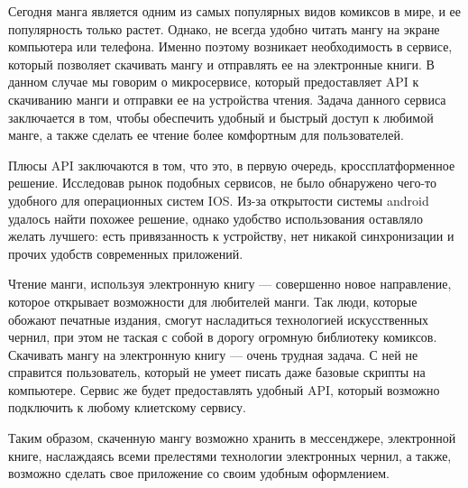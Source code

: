 \introduction %

Сегодня манга является одним из самых популярных видов комиксов в мире, и ее популярность только растет. 
Однако, не всегда удобно читать мангу на экране компьютера или телефона. 
Именно поэтому возникает необходимость в сервисе, который позволяет скачивать мангу и отправлять ее на электронные книги. 
В данном случае мы говорим о микросервисе, который предоставляет API к скачиванию манги и отправки ее на устройства чтения. 
Задача данного сервиса заключается в том, чтобы обеспечить удобный и быстрый доступ к любимой манге, а также сделать ее чтение более комфортным для пользователей.

Плюсы API заключаются в том, что это, в первую очередь, кроссплатформенное решение. 
Исследовав рынок подобных сервисов, не было обнаружено чего-то удобного для операционных систем IOS. 
Из-за открытости системы android удалось найти похожее решение, однако удобство использования оставляло желать лучшего: есть привязанность к устройству, нет никакой синхронизации и
прочих удобств современных приложений.

Чтение манги, используя электронную книгу --- совершенно новое направление, которое открывает возможности для любителей манги.
Так люди, которые обожают печатные издания, смогут насладиться технологией искусственных чернил, при этом не таская с собой в дорогу огромную библиотеку комиксов.
Скачивать мангу на электронную книгу --- очень трудная задача. С ней не справится пользователь, который не умеет писать даже базовые скрипты на компьютере.
Сервис же будет предоставлять удобный API, который возможно подключить к любому клиетскому сервису. 

Таким образом, скаченную мангу возможно хранить в мессенджере, электронной книге, наслаждаясь всеми прелестями технологии электронных чернил, а также, возможно сделать свое приложение со своим удобным оформлением.
